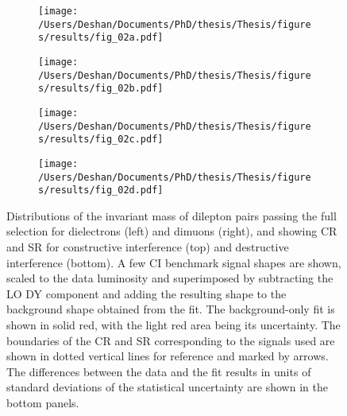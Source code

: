 \begin{figure}[!htpb]
    \centering
    \begin{subfigure}[b]{0.49\textwidth}
        \centering
        \texttt{[image: /Users/Deshan/Documents/PhD/thesis/Thesis/figures/results/fig\_02a.pdf]}
        \label{fig:fits1}
    \end{subfigure}
    \begin{subfigure}[b]{0.49\textwidth}
        \centering
        \texttt{[image: /Users/Deshan/Documents/PhD/thesis/Thesis/figures/results/fig\_02b.pdf]}
        \label{fig:fits2}
    \end{subfigure}
    \begin{subfigure}[b]{0.49\textwidth}
        \centering
        \texttt{[image: /Users/Deshan/Documents/PhD/thesis/Thesis/figures/results/fig\_02c.pdf]}
        \label{fig:fits3}
    \end{subfigure}
    \begin{subfigure}[b]{0.49\textwidth}
        \centering
        \texttt{[image: /Users/Deshan/Documents/PhD/thesis/Thesis/figures/results/fig\_02d.pdf]}
        \label{fig:fits4}
    \end{subfigure}
    \caption[Distributions of the invariant mass of dilepton pairs passing the full selection for dielectrons and dimuons. Where the background-only fit has been performed in the CR and extrapolated to the signal region.]{
    Distributions of the invariant mass of dilepton pairs passing the full selection for dielectrons (left) and dimuons (right), and showing CR and SR for constructive interference (top) and destructive interference (bottom).
    A few CI benchmark signal shapes are shown, scaled to the data luminosity and superimposed by subtracting the LO DY component and adding the resulting shape to the background shape obtained from the fit.
    The background-only fit is shown in solid red, with the light red area being its uncertainty.
    The boundaries of the CR and SR corresponding to the signals used are shown in dotted vertical lines for reference and marked by arrows.
    The differences between the data and the fit results in units of standard deviations of the statistical uncertainty are shown in the bottom panels.
    }
    \label{fig:fits}
\end{figure}

